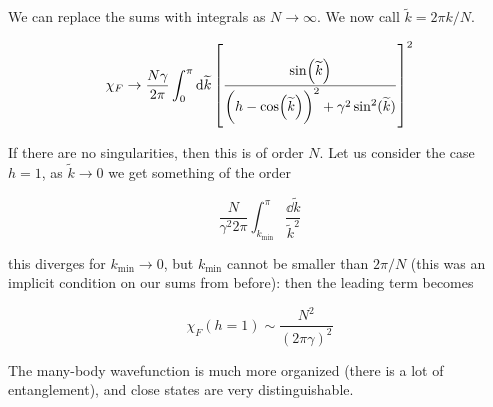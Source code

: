 \documentclass[main.tex]{subfiles}
\begin{document}
We can replace the sums with integrals as \(N \rightarrow \infty\). We now call \(\widetilde{k}=2\pi k / N \).

\begin{equation}
    \chi_F  \rightarrow \frac{N \gamma }{2 \pi} \int _{0}   ^{\pi} \dd{\widetilde{k}}
    \qty[\frac{\sin(\widetilde{k} ) }{\qty(h - \cos(\widetilde{k} ) )^2 + \gamma^2 \sin^2(\widetilde{k} ) }]^2
\end{equation}

If there are no singularities, then this is of order \(N\). Let us consider the case \(h = 1\),
as \(\widetilde{k} \rightarrow 0\) we get something of the order

\begin{equation}
    \frac{N}{\gamma^2 2 \pi } \int   _{k _{\text{min}}} ^{\pi }  \frac{\dd{\widetilde{k} }}{\widetilde{k}^2 }
\end{equation}

this diverges for \(k _{\text{min}} \rightarrow 0 \), but \(k_{\text{min}}\) cannot be smaller than \(2 \pi / N\) (this was an implicit condition on our sums from before): then the leading term becomes

\begin{equation}
    \chi_F (h = 1) \sim \frac{N^2}{(2 \pi \gamma)^2}
\end{equation}

The many-body wavefunction is much more organized (there is a lot of entanglement), and close states are very distinguishable.
\end{document}
